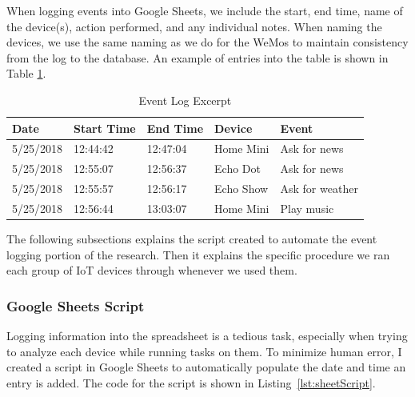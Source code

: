 When logging events into Google Sheets, we include the start, end time, name of the device(s), action performed, and any individual notes. When naming the devices, we use the same naming as we do for the WeMos to maintain consistency from the log to the database. An example of entries into the table is shown in Table \ref{tab:events}.

\begin{table}[H]
    \centering
    \caption{Event Log Excerpt}
    \begin{tabular}{@{}lllll@{}}
        \toprule
        Date & Start Time & End Time & Device & Event \\ \midrule
        5/25/2018 & 12:44:42 & 12:47:04 & Home Mini & Ask for news \\
        5/25/2018 & 12:55:07 & 12:56:37 & Echo Dot & Ask for news \\
        5/25/2018 & 12:55:57 & 12:56:17 & Echo Show & Ask for weather \\
        5/25/2018 & 12:56:44 & 13:03:07 & Home Mini & Play music \\ \bottomrule
        \end{tabular}
    \label{tab:events}
\end{table}

The following subsections explains the script created to automate the event logging portion of the research. Then it explains the specific procedure we ran each group of IoT devices through whenever we used them.

\subsubsection{Google Sheets Script}

Logging information into the spreadsheet is a tedious task, especially when trying to analyze each device while running tasks on them. To minimize human error, I created a script in Google Sheets to automatically populate the date and time an entry is added. The code for the script is shown in Listing~\ref{lst:sheetScript}.

